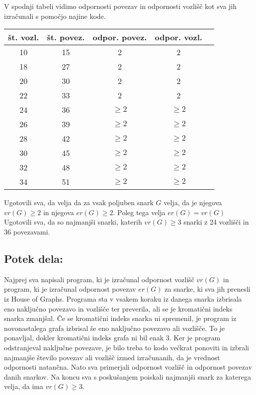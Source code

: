 \documentclass[a4paper, 10pt]{article}
\begin{document}
V spodnji tabeli vidimo odpornosti povezav in odpornosti vozlišč kot sva
jih izračunali s pomočjo najine kode.

\begin{center}
    \begin{tabular}{|c|c|c|c|c|}
        \hline
        št. vozl. & št. povez. & odpor. povez. & odpor. vozl. \\
        \hline
        10 & 15 & 2 & 2 \\ 
        \hline
        18 & 27 & 2 & 2 \\
        \hline
        20 & 30 & 2 & 2 \\
        \hline
        22 & 33 & 2 & 2 \\
        \hline
        24 & 36 & $\ge 2$ & $\ge 2$ \\
        \hline
        26 & 39 & $\ge 2$ & $\ge 2$\\
        \hline 
        28 & 42 & $\ge 2$ & $\ge 2$ \\
        \hline
        30 & 45 & $\ge 2$ & $\ge 2$ \\
        \hline
        32 & 48 & $\ge 2$ & $\ge 2$ \\
        \hline
        34 & 51 & $\ge 2$ & $\ge 2$ \\
        \hline
    \end{tabular}
    \end{center}

Ugotovili sva, da velja da za vsak poljuben snark $G$ velja, da je njegova $vr(G) \ge 2$ in
njegova $er(G) \ge 2$. Poleg tega velja $er(G) = vr(G) $ Ugotovili sva, da so najmanjši
snarki, katerih $vr(G) \ge 3$ snarki z 24 vozlišči in 36 povezavami.




\pagebreak
\subsection*{Potek dela:}
Najprej sva napisali program, ki je izračunal odpornost vozlišč $vr(G)$ in program, ki je 
izračunal odpornost povezav $er(G)$ za snarke, ki sva jih prenesli iz House of Graphs.
Programa sta v vsakem koraku iz danega snarka izbrisala eno naključno povezavo in vozlišče ter
preverila, ali se je kromatični indeks snarka zmanjšal. Če se kromatični indeks snarka ni 
spremenil, je program iz novonastalega grafa izbrisal še eno naključno povezavo ali vozlišče. To je 
ponavljal, dokler kromatični indeks grafa ni bil enak 3. Ker je program odstranjeval naključne
povezave, je bilo treba to kodo večkrat ponoviti in izbrali najmanjše število povezav ali vozlišč izmed
izračunanih, da je vrednost odpornosti natančna. 
Nato sva primerjali odpornost vozlišč in odpornost povezav danih snarkov. Na koncu sva s poskušanjem 
poiskali najmanjši snark za katerega velja, da ima $vr(G) \ge 3$.
\end{document}
